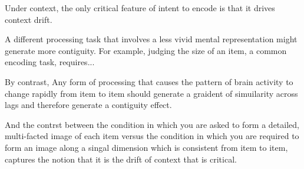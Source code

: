 Under context, the only critical feature of intent to encode is that it drives context drift. 



A different processing task that involves a less vivid mental representation might generate more contiguity. For example, judging the size of an item, a common encoding task, requires...  




By contrast, Any form of processing that causes the pattern of brain activity to change rapidly from item to item should generate a graident of simuilarity across lags and therefore generate a contiguity effect.




And the contrst between the condition in which you are asked to form a detailed, multi-facted image of each item versus the condition in which you are required to form an image along a singal dimension which is consistent from item to item, captures the notion that it is the drift of context that is critical.